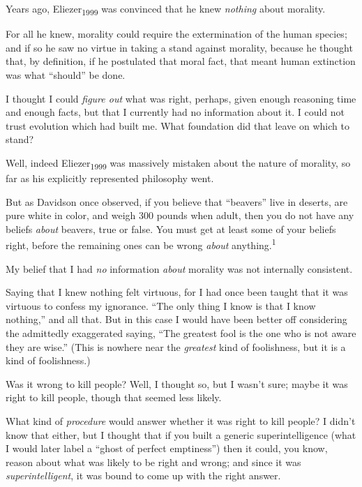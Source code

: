 \myendsectiontext


{
 Years ago, Eliezer\textsubscript{1999} was convinced that he knew
\textit{nothing} about morality. }

{
 For all he knew, morality could require the extermination of the
human species; and if so he saw no virtue in taking a stand against
morality, because he thought that, by definition, if he postulated that
moral fact, that meant human extinction was what
``should'' be done.}

{
 I thought I could \textit{figure out} what was right, perhaps,
given enough reasoning time and enough facts, but that I currently had
no information about it. I could not trust evolution which had built
me. What foundation did that leave on which to stand?}

{
 Well, indeed Eliezer\textsubscript{1999} was massively mistaken
about the nature of morality, so far as his explicitly represented
philosophy went.}

{
 But as Davidson once observed, if you believe that
``beavers'' live in deserts, are
pure white in color, and weigh 300 pounds when adult, then you do not
have any beliefs \textit{about} beavers, true or false. You must get at
least some of your beliefs right, before the remaining ones can be
wrong \textit{about} anything.\textsuperscript{1}}

{
 My belief that I had \textit{no} information \textit{about}
morality was not internally consistent.}

{
 Saying that I knew nothing felt virtuous, for I had once been
taught that it was virtuous to confess my ignorance.
``The only thing I know is that I know
nothing,'' and all that. But in this case I would
have been better off considering the admittedly exaggerated saying,
``The greatest fool is the one who is not aware they
are wise.'' (This is nowhere near the
\textit{greatest} kind of foolishness, but it is a kind of
foolishness.)}

{
 Was it wrong to kill people? Well, I thought so, but I
wasn't sure; maybe it was right to kill people, though
that seemed less likely.}

{
 What kind of \textit{procedure} would answer whether it was right
to kill people? I didn't know that either, but I
thought that if you built a generic superintelligence (what I would
later label a ``ghost of perfect
emptiness'') then it could, you know, reason about
what was likely to be right and wrong; and since it was
\textit{superintelligent}, it was bound to come up with the right
answer.}

